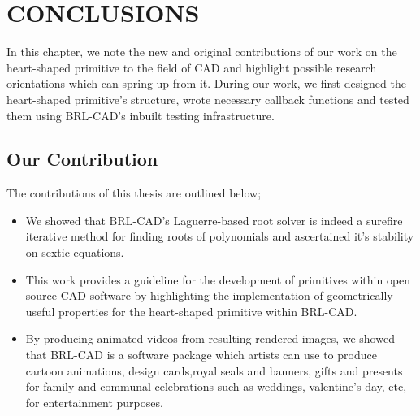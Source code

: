 \chapter{CONCLUSIONS}

\hspace{30} In   this   chapter,   we   note   the   new   and   original   contributions   of   our   work   on  
the   heart-­shaped   primitive   to   the   field   of   CAD   and   highlight  
possible   research   orientations   which   can   spring   up   from   it.   During   our   work,   we  
first   designed   the   heart­-shaped   primitive's   structure,   wrote   necessary   callback  
functions and tested them using BRL-­CAD's inbuilt testing infrastructure. 


\section{Our Contribution}

The contributions of this thesis are outlined below;  

\begin{itemize}
\item We   showed   that   BRL-­CAD's   Laguerre-­based   root   solver   is   indeed   a  
sure­fire   iterative   method   for   finding   roots   of   polynomials   and   ascertained  
it's stability on sextic equations.  
\item This   work   provides   a   guideline   for   the   development   of   primitives   within  
open   source   CAD   software   by   highlighting   the  implementation   of   
geometrically­ useful properties for the heart-shaped primitive within BRL-­CAD.
\item By   producing   animated   videos   from   resulting   rendered   images,   we  
showed   that   BRL­-CAD   is   a   software   package   which   artists   can   use   to  
produce   cartoon   animations,   design   cards,royal   seals   and   banners,   gifts  
and   presents   for   family   and   communal   celebrations   such   as   weddings,  
valentine's day, etc, for entertainment purposes.
\end{itemize}

